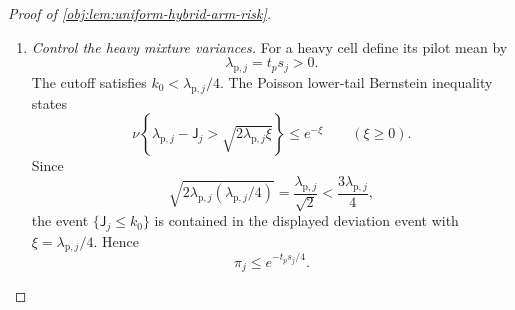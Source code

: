 \documentclass[11pt]{article}
\begin{document}
\begin{proof}[Proof of \cref{obj:lem:uniform-hybrid-arm-risk}]
\begin{enumerate}
The pilot is independent of both branches. Consequently,
\[
\begin{aligned}
\mathbb E_\nu[\mathcal V_j]
&=\pi_j\mathbb E_\nu[\mathcal P_j]
+(1-\pi_j)\mathbb E_\nu[\mathcal H_j],\\
\mathbb E_\nu[\mathcal V_j^2]
&=\pi_j\mathbb E_\nu[\mathcal P_j^2]
+(1-\pi_j)\mathbb E_\nu[\mathcal H_j^2].
\end{aligned}
\]
Subtracting the square of the first identity from the second gives
\[
\operatorname{Var}_\nu(\mathcal V_j)
=
\pi_j\operatorname{Var}_\nu(\mathcal P_j)
+(1-\pi_j)\operatorname{Var}_\nu(\mathcal H_j)
+\pi_j(1-\pi_j)\delta_j^2.
\]

For \(0<s_j\le B\), the residual bound in
\cref{obj:lem:chebyshev-factorial-certificate} yields
\[
0\le v_j\bar\mu_jE_L(\zeta_j)
\le\frac{v_jB}{L^2s_j}
\le\frac B{\epsilon L^2}.
\]
The last inequality follows from \(\epsilon v_j\le s_j\). Using the branch means and \((x-y)^2\le2x^2+2y^2\), we obtain
\[
\pi_j(1-\pi_j)\delta_j^2
\le
2\left(\frac B{\epsilon L^2}\right)^2
+2\bigl(p_je^{-ts_j}\bigr)^2.
\]
For \(s_j=0\), the branch means vanish and the same bound applies.

Overlap and the elementary bound \(xe^{-x}\le e^{-1}\) for \(x\ge0\) give
\[
\bigl(p_je^{-ts_j}\bigr)^2
\le p_j^2e^{-2t\epsilon p_j}
\le\frac{p_j}{2e\,t\epsilon}.
\]
Thus
\[
\sum_{j\in\mathcal J_{\mathrm{light}}}
\pi_j(1-\pi_j)\delta_j^2
\le
2c_{\mathrm{light}}
\left(\frac B{\epsilon L^2}\right)^2
+\frac1{e\,t\epsilon}.
\]
Combining this with the polynomial variance bound and
\(0\le\pi_j\le1\) proves
\[
\begin{aligned}
\sum_{j\in\mathcal J_{\mathrm{light}}}
\operatorname{Var}_\nu(\mathcal V_j)
\le{}&
\sum_{j\in\mathcal J_{\mathrm{light}}}
\operatorname{Var}_\nu(\mathcal H_j)\\
&+6F_{\mathrm{grow}}
\left(
\frac{M_{\mathrm{light}}}{u\epsilon}
+\frac{M_{\mathrm{light}}}{t}
+\frac{c_{\mathrm{light}}B^2}{\epsilon^2}
\right)\\
&+2c_{\mathrm{light}}
\left(\frac B{\epsilon L^2}\right)^2
+\frac1{e\,t\epsilon}.
\end{aligned}
\]

\item \textit{Control the heavy mixture variances.}
For a heavy cell define its pilot mean by
\[
\lambda_{\mathrm p,j}=t_ps_j>0.
\]
The cutoff satisfies \(k_0<\lambda_{\mathrm p,j}/4\). The Poisson lower-tail Bernstein inequality states
\[
\nu\left\{
\lambda_{\mathrm p,j}-\mathsf J_j
>\sqrt{2\lambda_{\mathrm p,j}\xi}
\right\}\le e^{-\xi}
\qquad(\xi\ge0).
\]
Since
\[
\sqrt{2\lambda_{\mathrm p,j}(\lambda_{\mathrm p,j}/4)}
=\frac{\lambda_{\mathrm p,j}}{\sqrt2}
<\frac{3\lambda_{\mathrm p,j}}4,
\]
the event \(\{\mathsf J_j\le k_0\}\) is contained in the displayed deviation event with \(\xi=\lambda_{\mathrm p,j}/4\). Hence
\[
\pi_j\le e^{-t_ps_j/4}.
\]


\end{enumerate}
\end{proof}
\end{document}
